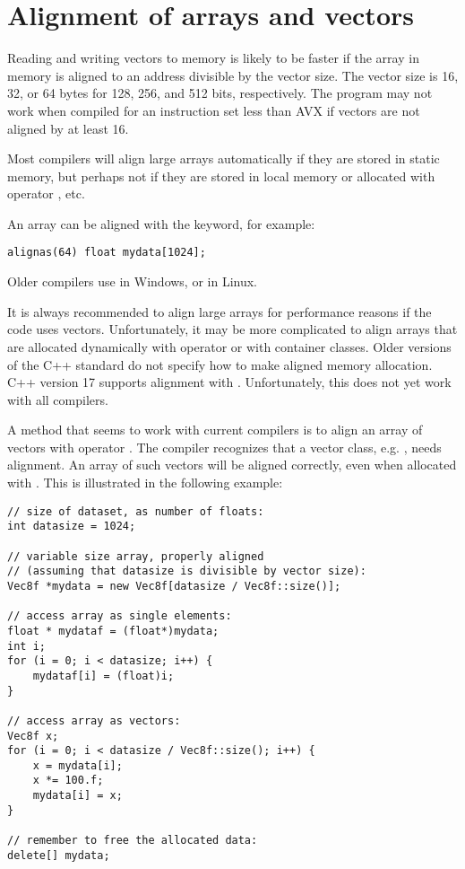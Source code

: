 \documentclass[vcl_manual.tex]{subfiles}
\begin{document}
\section{Alignment of arrays and vectors}\label{Alignment}

Reading and writing vectors to memory is likely to be faster if the array in memory is aligned to an address divisible by the vector size. The vector size is 16, 32, or 64 bytes for 128, 256, and 512 bits, respectively. The program may not work when compiled for an instruction set less than AVX if vectors are not aligned by at least 16.

Most compilers will align large arrays automatically if they are stored in static memory, but perhaps not if they are stored in local memory or allocated with operator , etc.

An array can be aligned with the  keyword, for example:

\begin{lstlisting}[frame=none]
alignas(64) float mydata[1024];
\end{lstlisting}

Older compilers use  in Windows, or 
  in Linux.


It is always recommended to align large arrays for performance reasons if the code uses vectors. Unfortunately, it may be more complicated to align arrays that are allocated dynamically with operator  or with container classes. 
Older versions of the C++ standard do not specify how to make aligned memory allocation. C++ version 17 supports alignment with . Unfortunately, this does not yet work with all compilers.

A method that seems to work with current compilers is to align an array of vectors with operator . The compiler recognizes that a vector class, e.g. , needs alignment. An array of such vectors will be aligned correctly, even when allocated with . This is illustrated in the following example:

\begin{lstlisting}[frame=none]
// size of dataset, as number of floats:
int datasize = 1024;

// variable size array, properly aligned
// (assuming that datasize is divisible by vector size):
Vec8f *mydata = new Vec8f[datasize / Vec8f::size()];

// access array as single elements:
float * mydataf = (float*)mydata;
int i;
for (i = 0; i < datasize; i++) {
    mydataf[i] = (float)i;
}

// access array as vectors:
Vec8f x;
for (i = 0; i < datasize / Vec8f::size(); i++) {
    x = mydata[i];
    x *= 100.f;
    mydata[i] = x;
}

// remember to free the allocated data:
delete[] mydata;
\end{lstlisting}
\end{document}
